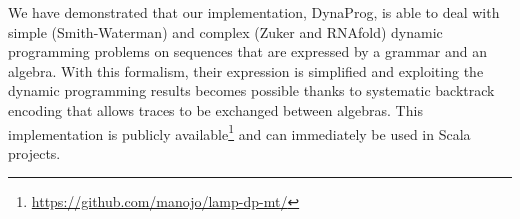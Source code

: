 We have demonstrated that our implementation, DynaProg, is able to deal with simple (Smith-Waterman) and complex (Zuker and RNAfold) dynamic programming problems on sequences that are expressed by a grammar and an algebra. With this formalism, their expression is simplified and exploiting the dynamic programming results becomes possible thanks to systematic backtrack encoding that allows traces to be exchanged between algebras. This implementation is publicly available\footnote{\url{https://github.com/manojo/lamp-dp-mt/}} and can immediately be used in Scala projects.

%
